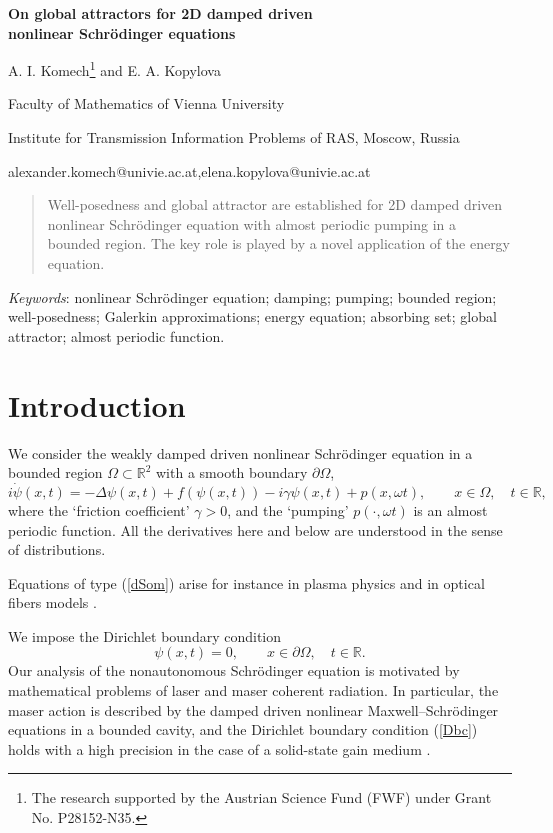 \documentclass[11pt]{article}
\date{}
\newcommand{\R}{{\mathbb R}}
\newcommand{\om}{\omega}
\newcommand{\De}{\Delta}
\newcommand{\ga}{\gamma}
\newcommand{\Om}{\Omega}
\newcommand{\pa}{\partial}
\newcommand{\5}{{\hspace{0.5mm}}}
\numberwithin{equation}{section}
\newcommand{\ci}{\cite}
\newcommand{\la}{\label}
\newcommand{\be}{\begin{equation}}
\newcommand{\ee}{\end{equation}}
\newcommand{\bce}{\begin{center}}
\newcommand{\ece}{\end{center}}
\numberwithin{equation}{section}
\begin{document}
\bce
{\huge\bf  On  global attractors  for 2D damped driven
\bigskip\\
 nonlinear Schr\"odinger equations}
\bigskip \bigskip

 {\Large A. I. Komech\footnote{The research supported by the Austrian Science Fund (FWF) under Grant No. P28152-N35.}
 and E. A. Kopylova}
  \medskip
 \\
{\it
\centerline{Faculty of Mathematics of Vienna University
 }
 
{\it
\centerline{Institute for Transmission Information Problems of RAS, Moscow, Russia}
 }
 
  
}
 \ece
 \centerline{alexander.komech@univie.ac.at,\quad elena.kopylova@univie.ac.at}

\bigskip\bigskip


\begin{abstract}
Well-posedness and global attractor  are established for 2D damped driven nonlinear Schr\"odinger
equation with almost periodic pumping in a bounded region.
The key role is played by a novel application of the energy equation.

\end{abstract}

{\it Keywords}: nonlinear Schr\"odinger
equation; damping;  pumping; bounded region; well-posedness; Galerkin approximations; energy equation; absorbing set; global attractor;  almost periodic function.


\tableofcontents

\section{Introduction}\la{sLM}
We consider the weakly damped driven nonlinear Schr\"odinger
equation in a bounded region $\Om\subset \R^2$ with a smooth boundary $\pa\Om$,
\be\la{dSom}
i\dot\psi(x,t)=-\De\psi(x,t)+f(\psi(x,t))-i\ga\psi(x,t)+p(x,\om t),\qquad x\in\Om,\quad t\in\R,
\ee
where the `friction coefficient' $\ga>0$, and the `pumping' $p(\cdot,\om t)$ is an almost periodic function.
All the derivatives here and below are understood in the sense of distributions.

Equations of type (\ref{dSom}) arise for instance in plasma physics \ci{NB1986} and in optical fibers models \ci{BD1984}.
\smallskip

We impose the Dirichlet boundary condition
\be\la{Dbc}
\psi(x,t)=0,\qquad x\in\pa\Om,\quad t\in\R.
\ee
Our analysis of the nonautonomous Schr\"odinger equation
is motivated by mathematical problems of laser and maser coherent radiation.
In particular,
the maser action is described by the damped driven nonlinear
Maxwell--Schr\"odinger equations in a bounded cavity,
and the Dirichlet boundary condition (\ref{Dbc})
 holds with a high precision  in the case of a solid-state  gain medium \ci{H1984}.
\end{document}
